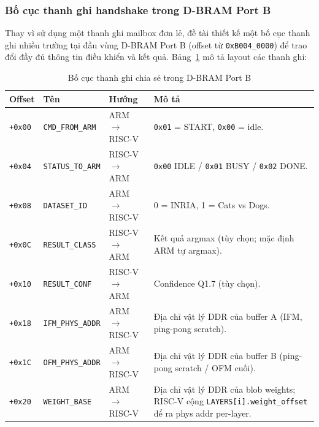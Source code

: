 \subsubsection{Bố cục thanh ghi handshake trong D-BRAM Port B}
\label{sec:handshake_regs}
Thay vì sử dụng một thanh ghi mailbox đơn lẻ, đề tài thiết kế một bố cục thanh ghi nhiều trường tại đầu vùng D-BRAM Port B (offset từ \texttt{0xB004\_0000}) để trao đổi đầy đủ thông tin điều khiển và kết quả. Bảng~\ref{tab:shared_regs} mô tả layout các thanh ghi:

\begin{table}[h]
\centering
\caption{Bố cục thanh ghi chia sẻ trong D-BRAM Port B}
\label{tab:shared_regs}
\begin{tabular}{|l|l|p{2.2cm}|p{6cm}|}
\hline
\textbf{Offset} & \textbf{Tên} & \textbf{Hướng} & \textbf{Mô tả} \\ \hline
\texttt{+0x00} & \texttt{CMD\_FROM\_ARM} & ARM $\to$ RISC-V & \texttt{0x01} = START, \texttt{0x00} = idle. \\ \hline
\texttt{+0x04} & \texttt{STATUS\_TO\_ARM} & RISC-V $\to$ ARM & \texttt{0x00} IDLE / \texttt{0x01} BUSY / \texttt{0x02} DONE. \\ \hline
\texttt{+0x08} & \texttt{DATASET\_ID} & ARM $\to$ RISC-V & 0 = INRIA, 1 = Cats vs Dogs. \\ \hline
\texttt{+0x0C} & \texttt{RESULT\_CLASS} & RISC-V $\to$ ARM & Kết quả argmax (tùy chọn; mặc định ARM tự argmax). \\ \hline
\texttt{+0x10} & \texttt{RESULT\_CONF} & RISC-V $\to$ ARM & Confidence Q1.7 (tùy chọn). \\ \hline
\texttt{+0x18} & \texttt{IFM\_PHYS\_ADDR} & ARM $\to$ RISC-V & Địa chỉ vật lý DDR của buffer A (IFM, ping-pong scratch). \\ \hline
\texttt{+0x1C} & \texttt{OFM\_PHYS\_ADDR} & ARM $\to$ RISC-V & Địa chỉ vật lý DDR của buffer B (ping-pong scratch / OFM cuối). \\ \hline
\texttt{+0x20} & \texttt{WEIGHT\_BASE} & ARM $\to$ RISC-V & Địa chỉ vật lý DDR của blob weights; RISC-V cộng \texttt{LAYERS[i].weight\_offset} để ra phys addr per-layer. \\ \hline
\end{tabular}
\end{table}

